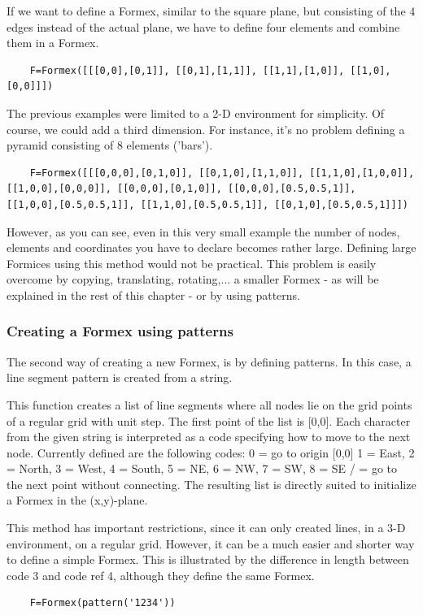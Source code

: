 \documentclass[a4paper]{manual}
\begin{document}
{If we want to define a Formex, similar to the square plane, but consisting of the 4 edges instead of the actual plane, we have to define four elements and combine them in a Formex.
\begin{verbatim}
	F=Formex([[[0,0],[0,1]], [[0,1],[1,1]], [[1,1],[1,0]], [[1,0],[0,0]]])
\end{verbatim}

The previous examples were limited to a 2-D environment for simplicity. Of course, we could add a third dimension. For instance, it's no problem defining a pyramid consisting of 8 elements ('bars').
\begin{verbatim}
	F=Formex([[[0,0,0],[0,1,0]], [[0,1,0],[1,1,0]], [[1,1,0],[1,0,0]], [[1,0,0],[0,0,0]], [[0,0,0],[0,1,0]], [[0,0,0],[0.5,0.5,1]], 		[[1,0,0],[0.5,0.5,1]], [[1,1,0],[0.5,0.5,1]], [[0,1,0],[0.5,0.5,1]]])
\end{verbatim}
However, as you can see, even in this very small example the number of nodes, elements and coordinates you have to declare becomes rather large. Defining large Formices using this method would not be practical. This problem is easily overcome by copying, translating, rotating,... a smaller Formex - as will be explained in the rest of this chapter - or by using patterns.
 
\subsubsection{Creating a Formex using patterns}

The second way of creating a new Formex, is by defining patterns. In this case, a line segment pattern is created from a string.

    This function creates a list of line segments where all nodes lie on the
    grid points of a regular grid with unit step.
    The first point of the list is [0,0]. Each character from the given
    string is interpreted as a code specifying how to move to the next node.
    Currently defined are the following codes:
    0 = go to origin [0,0]
    1 = East, 2 = North, 3 = West, 4 = South, 5 = NE, 6 = NW, 7 = SW, 8 = SE
    / = go to the next point without connecting.
    The resulting list is directly suited to initialize a Formex in the
    (x,y)-plane.

This method has important restrictions, since it can only created lines, in a 3-D environment, on a regular grid. However, it can be a much easier and shorter way to define a simple Formex. This is illustrated by the difference in length between code 3 and code ref 4, although they define the same Formex.%
\begin{verbatim}
	F=Formex(pattern('1234'))
\end{verbatim}

}
\end{document}
